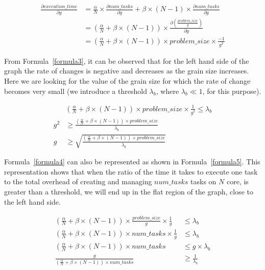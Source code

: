  
\begin{equation}\label{formula3}
\begin{aligned}
\frac{\partial execution\_{time}}{\partial g} &= \frac{\alpha}{N}\times{\frac{\partial num\_{tasks}}{\partial g}}+\beta\times(N-1)\times{\frac{\partial num\_{tasks}}{\partial g}} \\
&=(\frac{\alpha}{N}+\beta\times(N-1))\times\frac{\partial(\frac{problem\_{size}}{g})}{\partial g} \\
&=(\frac{\alpha}{N}+\beta\times(N-1))\times{problem\_{size}}\times{\frac{-1}{g^2}}
\end{aligned}
\end{equation}

From Formula~\ref{formula3}, it can be observed that for the left hand side of the graph the rate of changes is negative and decreases as the grain size increases. Here we are looking for the value of the grain size for which the rate of change becomes very small (we introduce a threshold $\lambda_b$, where $\lambda_b\ll1$, for this purpose). 


\begin{equation}\label{formula4}
\begin{aligned}
&(\frac{\alpha}{N}+\beta\times(N-1))\times{problem\_{size}}\times{\frac{1}{g^2}}\leq{\lambda_b} \\
{g^2}&\geq{\frac{(\frac{\alpha}{N}+\beta\times(N-1))\times{problem\_{size}}}{\lambda_b}}\\
{g}&\geq{\sqrt{\frac{(\frac{\alpha}{N}+\beta\times(N-1))\times{problem\_{size}}}{\lambda_b}}}
\end{aligned}
\end{equation}

Formula~\ref{formula4} can also be represented as shown in Formula~\ref{formula5}. This representation shows that when the ratio of the time it takes to execute one task to the total overhead of creating and managing $num\_{tasks}$ tasks on $N$ core, is greater than a threshold, we will end up in the flat region of the graph, close to the left hand side.


\begin{equation}\label{formula5}
\begin{aligned}
(\frac{\alpha}{N}+\beta\times(N-1))\times{\frac{problem\_{size}}{g}}\times{\frac{1}{g}}&\leq{\lambda_b}\\
(\frac{\alpha}{N}+\beta\times(N-1))\times{num\_{tasks}}\times{\frac{1}{g}}&\leq{\lambda_b}\\
(\frac{\alpha}{N}+\beta\times(N-1))\times{num\_{tasks}}&\leq{g\times\lambda_b}\\	
\frac{g}{(\frac{\alpha}{N}+\beta\times(N-1))\times{num\_{tasks}}}&\geq{\frac{1}{\lambda_b}}
\end{aligned}
\end{equation}


